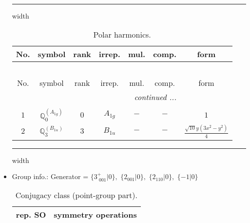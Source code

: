 \documentclass[fleqn,10pt,landscape]{article}
\begin{document}
\begin{itemize}
 \hfil \hrule height 1mm width \textwidth \hfil

\begin{center}
\renewcommand{\arraystretch}{1.3}
\begin{longtable}{ccccccc}
\caption{Polar harmonics.}
 \\
 \hline \hline
No. & symbol & rank & irrep. & mul. & comp. & form \\ \hline \endfirsthead

\multicolumn{6}{l}{\tablename\ \thetable{}} \\
 \hline \hline
No. & symbol & rank & irrep. & mul. & comp. & form \\ \hline \endhead

 \hline \hline
\multicolumn{6}{r}{\footnotesize\it continued ...} \\ \endfoot

 \hline \hline
\multicolumn{6}{r}{} \\ \endlastfoot

$ 1 $ & $ \mathbb{Q}_{0}^{(A_{1g})} $ & $ 0 $ & $ A_{1g} $ & $ - $ & $ - $ & $ 1 $ \\ \hline
$ 2 $ & $ \mathbb{Q}_{3}^{(B_{1u})} $ & $ 3 $ & $ B_{1u} $ & $ - $ & $ - $ & $ \frac{\sqrt{10} y \left(3 x^{2} - y^{2}\right)}{4} $ \\
\end{longtable}
\end{center}

 \hfil \hrule height 1mm width \textwidth \hfil

\item Group info.: Generator = $\{3^{+}_{\,\,001}|0\},\,\,\{2{}_{001}|0\},\,\,\{2{}_{110}|0\},\,\,\{-1|0\}$

\begin{center}
\renewcommand{\arraystretch}{1.3}
\begin{longtable}{c|l}
\caption{Conjugacy class (point-group part).}
 \\
 \hline \hline
rep. SO & symmetry operations \\ \hline \endfirsthead


\end{longtable}
\end{center}
\end{itemize}
\end{document}
